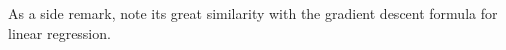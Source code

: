 As a side remark, note its great similarity with the gradient descent formula for linear regression.













